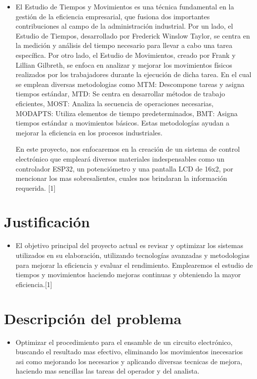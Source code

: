     \begin{itemize}
        \item 
    El Estudio de Tiempos y Movimientos es una técnica fundamental en la gestión de la eficiencia empresarial, que fusiona dos importantes contribuciones al campo de la administración industrial. Por un lado, el Estudio de Tiempos, desarrollado por Frederick Winslow Taylor, se centra en la medición y análisis del tiempo necesario para llevar a cabo una tarea específica. Por otro lado, el Estudio de Movimientos, creado por Frank y Lillian Gilbreth, se enfoca en analizar y mejorar los movimientos físicos realizados por los trabajadores durante la ejecución de dicha tarea. En el cual se emplean diversas metodologias como MTM: Descompone tareas y asigna tiempos estándar, MTD: Se centra en desarrollar métodos de trabajo eficientes, MOST: Analiza la secuencia de operaciones necesarias, MODAPTS: Utiliza elementos de tiempo predeterminados, BMT: Asigna tiempos estándar a movimientos básicos. Estas metodologías ayudan a mejorar la eficiencia en los procesos industriales. 
    
    En este proyecto, nos enfocaremos en la creación de un sistema de control electrónico que empleará diversos materiales indespensables como un controlador ESP32, un potenciómetro y una pantalla LCD de 16x2, por mencionar los mas sobresalientes, cuales nos brindaran la información requerida. [1]
    
    \end{itemize}
    \section{Justificación}
    
    \begin{itemize}
        \item El objetivo principal del proyecto actual es revisar y optimizar los sistemas utilizados en su elaboración, utilizando tecnologías avanzadas y metodologias  para mejorar la eficiencia y evaluar el rendimiento. Emplearemos el estudio de tiempos y movimientos haciendo mejoras continuas y obteniendo la mayor eficiencia.[1]
    \end{itemize}
    \section{Descripción del problema}
    \begin{itemize}
        \item Optimizar el procedimiento para el ensamble de un circuito electrónico, buscando el resultado mas efectivo, eliminando los movimientos inecesarios asi como mejorando los necesarios y aplicando diversas tecnicas de mejora, haciendo mas sencillas las tareas del operador y del analista.
    \end{itemize}
    
